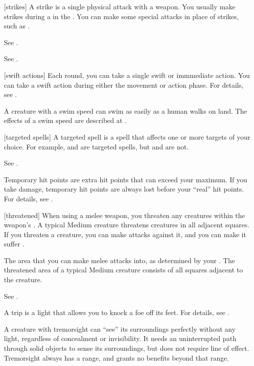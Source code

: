 [strikes] A strike is a single physical attack with a weapon.
You usually make strikes during a  in the .
You can make some special attacks in place of strikes, such as .

 See .

 See .

[swift actions] Each round, you can take a single swift or immmediate action.
You can take a swift action during either the movement or action phase.
For details, see .

 A creature with a swim speed can swim as easily as a human walks on land.
The effects of a swim speed are described at .

[targeted spells] A targeted spell is a spell that affects one or more targets of your choice.
For example,  and  are targeted spells, but  and  are not.

 See .

 Temporary hit points are extra hit points that can exceed your maximum.
If you take damage, temporary hit points are always lost before your ``real'' hit points.
For details, see .

[threatened] When using a melee weapon, you threaten any creatures within the weapon's .
A typical Medium creature threatens creatures in all adjacent squares.
If you threaten a creature, you can make  attacks against it, and you can make it suffer .

 The area that you can make melee attacks into, as determined by your .
The threatened area of a typical Medium creature consists of all squares adjacent to the creature.

 See .

 A trip is a light  that allows you to knock a foe off its feet.
For details, see .

 A creature with tremorsight can ``see'' its surroundings perfectly without any light, regardless of concealment or invisibility.
It needs an uninterrupted path through solid objects to sense its surroundings, but does not require line of effect.
Tremorsight always has a range, and grants no benefits beyond that range.

